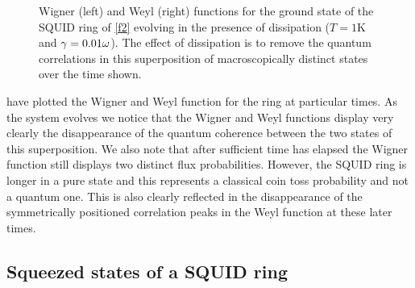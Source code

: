 \documentclass[12pt,a4paper,superscriptaddress,showpacs,floatfix,pra]{revtex4-2}
\begin{document}
\begin{figure}[!t]
\begin{center}
\end{center}
\caption{Wigner (left)  and Weyl  (right) functions  for  the ground
state of the  SQUID ring of \protect\ref{f2} evolving  in the presence
of dissipation ($T=1$K and $\protect\gamma =0.01\protect\omega $). The
effect of  dissipation is  to remove the  quantum correlations  in this superposition of macroscopically distinct states over the time shown. }
\label{f5}
\end{figure}
have plotted the  Wigner and Weyl function for  the ring at particular
times.   As the  system evolves  we notice  that the  Wigner  and Weyl
functions  display  very  clearly  the disappearance  of  the  quantum
coherence between the  two states of this superposition.  We also note
that  after sufficient  time  has elapsed  the  Wigner function  still
displays two distinct flux  probabilities.  However, the SQUID ring is
longer  in a  pure state  and this  represents a  classical  coin toss
probability and not  a quantum one. This is  also clearly reflected in
the disappearance of the symmetrically positioned correlation peaks in
the Weyl function at these later times.

\subsection{Squeezed states of a SQUID ring}
\end{document}
